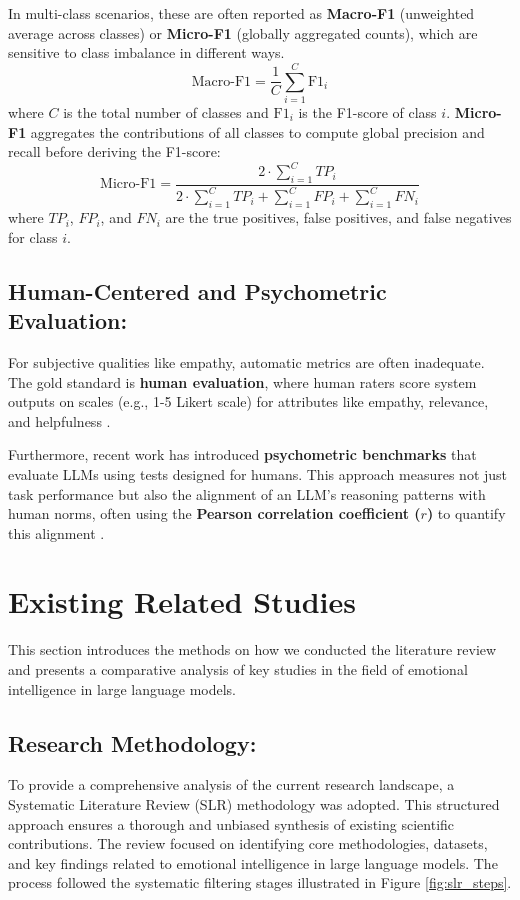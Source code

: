 In multi-class scenarios, these are often reported as \textbf{Macro-F1} (unweighted average across classes) or \textbf{Micro-F1} (globally aggregated counts), which are sensitive to class imbalance in different ways.
\begin{equation}
\text{Macro-F1} = \frac{1}{C} \sum_{i=1}^{C} \text{F1}_i
\end{equation}
where $C$ is the total number of classes and $\text{F1}_i$ is the F1-score of class $i$.
\textbf{Micro-F1} aggregates the contributions of all classes to compute global precision and recall before deriving the F1-score:
\begin{equation}
\text{Micro-F1} = \frac{2 \cdot \sum_{i=1}^{C} TP_i}{2 \cdot \sum_{i=1}^{C} TP_i + \sum_{i=1}^{C} FP_i + \sum_{i=1}^{C} FN_i}
\end{equation}
where $TP_i$, $FP_i$, and $FN_i$ are the true positives, false positives, and false negatives for class $i$.
\subsection{Human-Centered and Psychometric Evaluation:} 
For subjective qualities like empathy, automatic metrics are often inadequate. The gold standard is \textbf{human evaluation}, where human raters score system outputs on scales (e.g., 1-5 Likert scale) for attributes like empathy, relevance, and helpfulness \cite{rashkin2019empathetic}.

Furthermore, recent work has introduced \textbf{psychometric benchmarks} that evaluate LLMs using tests designed for humans. This approach measures not just task performance but also the alignment of an LLM's reasoning patterns with human norms, often using the \textbf{Pearson correlation coefficient ($r$)} to quantify this alignment \cite{zhou2023emotional}.

\section{Existing Related Studies}
This section introduces the methods on how we conducted the literature review and presents a comparative analysis of key studies in the field of emotional intelligence in large language models.
\subsection{Research Methodology:} 
To provide a comprehensive analysis of the current research landscape, a Systematic Literature Review (SLR) methodology was adopted. This structured approach ensures a thorough and unbiased synthesis of existing scientific contributions. The review focused on identifying core methodologies, datasets, and key findings related to emotional intelligence in large language models. The process followed the systematic filtering stages illustrated in Figure \ref{fig:slr_steps}.

